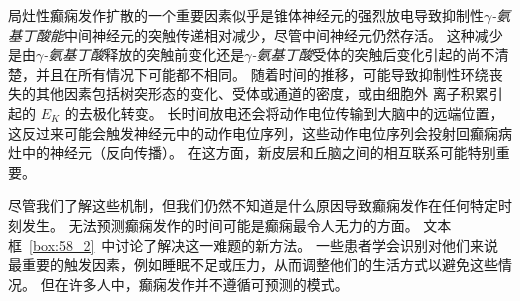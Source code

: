 局灶性癫痫发作扩散的一个重要因素似乎是锥体神经元的强烈放电导致抑制性\textit{$\gamma$-氨基丁酸能}中间神经元的突触传递相对减少，尽管中间神经元仍然存活。
这种减少是由\textit{$\gamma$-氨基丁酸}释放的突触前变化还是\textit{$\gamma$-氨基丁酸}受体的突触后变化引起的尚不清楚，并且在所有情况下可能都不相同。
随着时间的推移，可能导致抑制性环绕丧失的其他因素包括树突形态的变化、受体或通道的密度，或由细胞外  离子积累引起的 $ E_K $ 的去极化转变。
长时间放电还会将动作电位传输到大脑中的远端位置，这反过来可能会触发神经元中的动作电位序列，这些动作电位序列会投射回癫痫病灶中的神经元（反向传播）。
在这方面，新皮层和丘脑之间的相互联系可能特别重要。


尽管我们了解这些机制，但我们仍然不知道是什么原因导致癫痫发作在任何特定时刻发生。
无法预测癫痫发作的时间可能是癫痫最令人无力的方面。
文本框~\ref{box:58_2}~中讨论了解决这一难题的新方法。
一些患者学会识别对他们来说最重要的触发因素，例如睡眠不足或压力，从而调整他们的生活方式以避免这些情况。
但在许多人中，癫痫发作并不遵循可预测的模式。


